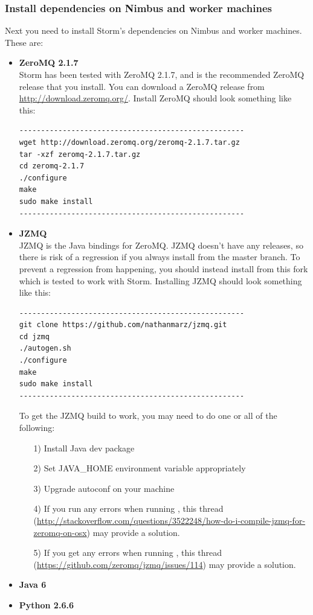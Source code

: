 \documentclass[a4paper, 12pt]{article}
\begin{document}
\subsubsection{Install dependencies on Nimbus and worker machines}
Next you need to install Storm's dependencies on Nimbus and worker machines. These are:
\begin{itemize}
\item \textbf{ZeroMQ 2.1.7}\\
Storm has been tested with ZeroMQ 2.1.7, and is the recommended ZeroMQ release that you install. You can download a ZeroMQ release from \url{http://download.zeromq.org/}. Install ZeroMQ should look something like this:
\begin{lstlisting}
----------------------------------------------------
wget http://download.zeromq.org/zeromq-2.1.7.tar.gz
tar -xzf zeromq-2.1.7.tar.gz
cd zeromq-2.1.7
./configure
make
sudo make install
----------------------------------------------------
\end{lstlisting}

\item \textbf{JZMQ}\\
JZMQ is the Java bindings for ZeroMQ. JZMQ doesn't have any releases, so there is risk of a regression if you always install from the master branch. To prevent a regression from happening, you should instead install from this fork which is tested to work with Storm. Installing JZMQ should look something like this:
\begin{lstlisting}
----------------------------------------------------
git clone https://github.com/nathanmarz/jzmq.git
cd jzmq
./autogen.sh
./configure
make
sudo make install
----------------------------------------------------
\end{lstlisting}
To get the JZMQ build to work, you may need to do one or all of the following:
\begin{itemize}
\item[1)] Install Java dev package
\item[2)] Set JAVA\_HOME environment variable appropriately
\item[3)] Upgrade autoconf on your machine
\item[4)] If you run any errors when running , this thread (\url{http://stackoverflow.com/questions/3522248/how-do-i-compile-jzmq-for-zeromq-on-osx}) may provide a solution.
\item[5)] If you get any errors when running , this thread (\url{https://github.com/zeromq/jzmq/issues/114}) may provide a solution.
\end{itemize}

\item \textbf{Java 6}

\item \textbf{Python 2.6.6}
\end{itemize}
\end{document}
